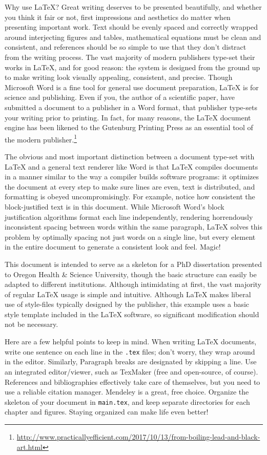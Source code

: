 Why use \LaTeX?
Great writing deserves to be presented beautifully, and whether you think it fair or not, first impressions and aesthetics do matter when presenting important work.
Text should be evenly spaced and correctly wrapped around interjecting figures and tables, mathematical equations must be clean and consistent, and references should be so simple to use that they don't distract from the writing process.
The vast majority of modern publishers type-set their works in LaTeX, and for good reason: the system is designed from the ground up to make writing look visually appealing, consistent, and precise.
Though Microsoft Word is a fine tool for general use document preparation, LaTeX is for science and publishing. 
Even if you, the author of a scientific paper, have submitted a document to a publisher in a Word format, that publisher type-sets your writing prior to printing. 
In fact, for many reasons, the LaTeX  document engine has been likened to the Gutenburg Printing Press as an essential tool of the modern publisher.\footnote{\url{http://www.practicallyefficient.com/2017/10/13/from-boiling-lead-and-black-art.html}}

The obvious and most important distinction between a document type-set with LaTeX and a general text renderer like Word is that LaTeX compiles documents in a manner similar to the way a compiler builds software programs: it optimizes the document at every step to make sure lines are even, text is distributed, and formatting is obeyed uncompromisingly.
For example, notice how consistent the block-justified text is in this document. 
While Microsoft Word's block justification algorithms format each line independently, rendering horrendously inconsistent spacing between words within the same paragraph, LaTeX solves this problem by optimally spacing not just words on a single line, but every element in the entire document to generate a consistent look and feel.
Magic!

This document is intended to serve as a skeleton for a PhD dissertation presented to Oregon Health \& Science University, though the basic structure can easily be adapted to different institutions.
Although intimidating at first, the vast majority of regular LaTeX usage is simple and intuitive. 
Although LaTeX makes liberal use of style-files typically designed by the publisher, this example uses a basic style template included in the LaTeX software, so significant modification should not be necessary.

Here are a few helpful points to keep in mind. 
When writing LaTeX documents, write one sentence on each line in the \texttt{.tex} files; don't worry, they wrap around in the editor. 
Similarly, Paragraph breaks are designated by skipping a line.
Use an integrated editor/viewer, such as TexMaker (free and open-source, of course).
References and bibliographies effectively take care of themselves, but you need to use a reliable citation manager. Mendeley is a great, free choice.
Organize the skeleton of your document in \texttt{main.tex}, and keep separate directories for each chapter and figures. 
Staying organized can make life even better!

